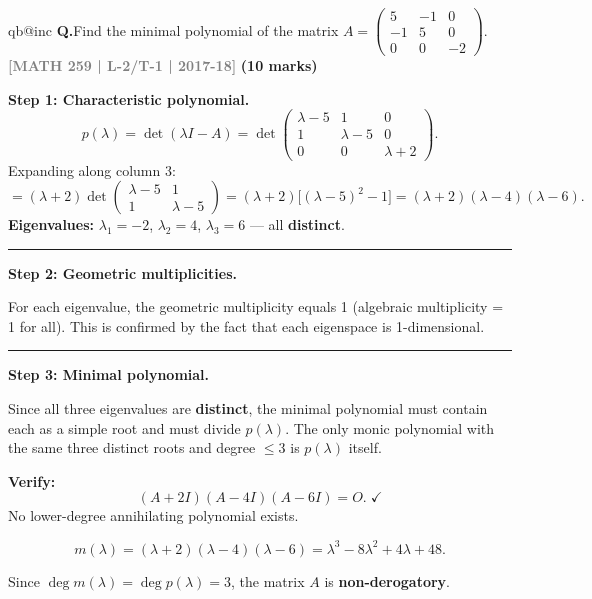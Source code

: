 \documentclass[12pt,a3paper]{article}
\makeatletter
\newcommand{\yr}[1]{\hfill\textcolor{gray}{\small\textbf{[#1]}}}
\newcommand{\mk}[1]{\textcolor{orange!70!black}{\small\textbf{(#1 marks)}}}
\newcounter{qnum}
\newcommand{\Q}[1]{%
  \csname qb@inc\endcsname
  \needspace{4\baselineskip}
  \refstepcounter{qnum}
  \vspace{6pt}
  \noindent\textbf{Q\theqnum.}\enspace #1\par
}
\makeatother
\begin{document}
\Q{Find the minimal polynomial of the matrix $A = \begin{pmatrix} 5 & -1 & 0 \\ -1 & 5 & 0 \\ 0 & 0 & -2 \end{pmatrix}$.
\yr{MATH 259 | L-2/T-1 | 2017-18} \mk{10}}

\begin{tcolorbox}[enhanced,breakable,
  colback=cE!4,colframe=cE,boxrule=0.8pt,arc=5pt,
  title={\textbf{Answer --- Minimal Polynomial of
    $A=\begin{pmatrix}5&-1&0\\-1&5&0\\0&0&-2\end{pmatrix}$}},
  fonttitle=\bfseries\color{white},colbacktitle=cE]

\textbf{Step 1: Characteristic polynomial.}
\[
  p(\lambda) = \det(\lambda I - A)
  = \det\begin{pmatrix}\lambda-5&1&0\\1&\lambda-5&0\\0&0&\lambda+2\end{pmatrix}.
\]
Expanding along column 3:
\[
  = (\lambda+2)\det\begin{pmatrix}\lambda-5&1\\1&\lambda-5\end{pmatrix}
  = (\lambda+2)\bigl[(\lambda-5)^2 - 1\bigr]
  = (\lambda+2)(\lambda-4)(\lambda-6).
\]
\textbf{Eigenvalues:} $\lambda_1 = -2$, $\lambda_2 = 4$, $\lambda_3 = 6$ — all \textbf{distinct}.

\medskip\textcolor{cE}{\rule{\textwidth}{0.4pt}}

\textbf{Step 2: Geometric multiplicities.}

For each eigenvalue, the geometric multiplicity equals 1 (algebraic multiplicity = 1
for all). This is confirmed by the fact that each eigenspace is 1-dimensional.

\medskip\textcolor{cE}{\rule{\textwidth}{0.4pt}}

\textbf{Step 3: Minimal polynomial.}

Since all three eigenvalues are \textbf{distinct}, the minimal polynomial must contain
each as a simple root and must divide $p(\lambda)$. The only monic polynomial with the
same three distinct roots and degree $\leq 3$ is $p(\lambda)$ itself.

\textbf{Verify:}
\[
  (A+2I)(A-4I)(A-6I) = O.\;\checkmark
\]
No lower-degree annihilating polynomial exists.

\[
  \boxed{m(\lambda) = (\lambda+2)(\lambda-4)(\lambda-6)
  = \lambda^3 - 8\lambda^2 + 4\lambda + 48.}
\]

Since $\deg m(\lambda) = \deg p(\lambda) = 3$, the matrix $A$ is
\textbf{non-derogatory}.

\end{tcolorbox}
\end{document}
